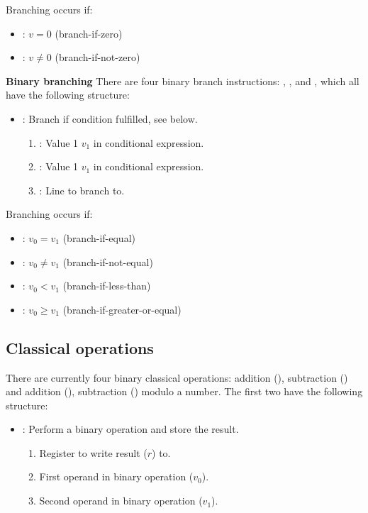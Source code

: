 Branching occurs if:
\begin{itemize}
  \item {}: $v = 0$ (branch-if-zero)
  \item {}: $v \neq 0$ (branch-if-not-zero)
\end{itemize}

\textbf{Binary branching}
There are four binary branch instructions: , ,  and , which all have the following structure:
\begin{itemize}
  \item {}: Branch if condition fulfilled, see below.
        \begin{enumerate}
          \item \REGISTER: Value 1 $v_1$ in conditional expression.
          \item \REGISTER: Value 1 $v_1$ in conditional expression.
          \item \IMMEDIATE: Line to branch to.
        \end{enumerate}
\end{itemize}

Branching occurs if:
\begin{itemize}
  \item {}: $v_0 = v_1$ (branch-if-equal)
  \item {}: $v_0 \neq v_1$ (branch-if-not-equal)
  \item {}: $v_0 < v_1$ (branch-if-less-than)
  \item {}: $v_0 \geq v_1$ (branch-if-greater-or-equal)
\end{itemize}


\subsection{Classical operations}
There are currently four binary classical operations: addition (), subtraction () and addition (), subtraction () modulo a number.
The first two have the following structure:
\begin{itemize}
  \item {}: Perform a binary operation and store the result.
        \begin{enumerate}
          \item \REGISTER Register to write result ($r$) to.
          \item \REGISTER First operand in binary operation ($v_0$).
          \item \REGISTER Second operand in binary operation ($v_1$).
        \end{enumerate}
\end{itemize}

